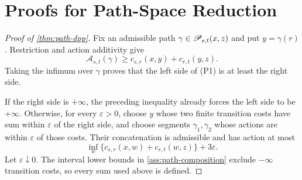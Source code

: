 \section{Proofs for Path-Space Reduction}
\label{app:path-proofs}

\begin{proof}[Proof of \cref{thm:path-dpp}]
Fix an admissible path \(\gamma\in\mathscr P_{s,t}(x,z)\) and put
\(y=\gamma(r)\).  Restriction and action additivity give
\[
  \mathcal A_{s,t}(\gamma)
  \ge
  c_{s,r}(x,y)+c_{r,t}(y,z).
\]
Taking the infimum over \(\gamma\) proves that the left side of (P1) is at
least the right side.

If the right side is \(+\infty\), the preceding inequality already forces the
left side to be \(+\infty\).  Otherwise, for every \(\varepsilon>0\), choose
\(y\) whose two finite transition costs have sum within \(\varepsilon\) of
the right side, and choose segments \(\gamma_1,\gamma_2\) whose actions are
within \(\varepsilon\) of those costs.  Their concatenation is admissible and
has action at most
\[
  \inf_{w}\{c_{s,r}(x,w)+c_{r,t}(w,z)\}+3\varepsilon.
\]
Let \(\varepsilon\downarrow0\).  The interval lower bounds in
\cref{ass:path-composition} exclude \(-\infty\) transition costs, so every
sum used above is defined.
\end{proof}

